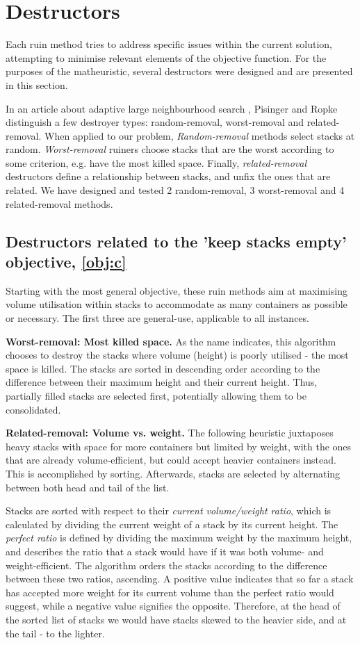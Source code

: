 \documentclass[preprint,11pt,3p]{elsarticle}
\begin{document}
\section{Destructors}
\label{sec:Neighbourhoods}
Each ruin method tries to address specific issues within the current solution, attempting to minimise relevant elements of the objective function. For the purposes of the matheuristic, several destructors were designed and are presented in this section.

In an article about adaptive large neighbourhood search \cite{PR-ALNS}, Pisinger and Ropke distinguish a few destroyer types: random-removal, worst-removal and related-removal. When applied to our problem, \textit{Random-removal} methods select stacks at random. \textit{Worst-removal} ruiners choose stacks that are the worst according to some criterion, e.g. have the most killed space. Finally, \textit{related-removal} destructors define a relationship between stacks, and unfix the ones that are related. We have designed and tested 2 random-removal, 3 worst-removal and 4 related-removal methods.

\subsection{Destructors related to the 'keep stacks empty' objective, \ref{obj:c}}
Starting with the most general objective, these ruin methods aim at maximising volume utilisation within stacks to accommodate as many containers as possible or necessary. The first three are general-use, applicable to all instances.

\textbf{Worst-removal: Most killed space.} As the name indicates, this algorithm chooses to destroy the stacks where volume (height) is poorly utilised - the most space is killed. The stacks are sorted in descending order according to the difference between their maximum height and their current height. Thus, partially filled stacks are selected first, potentially allowing them to be consolidated.

\textbf{Related-removal: Volume vs. weight.} The following heuristic juxtaposes heavy stacks with space for more containers but limited by weight, with the ones that are already volume-efficient, but could accept heavier containers instead. This is accomplished by sorting. Afterwards, stacks are selected by alternating between both head and tail of the list.

Stacks are sorted with respect to their \textit{current volume/weight ratio}, which is calculated by dividing the current weight of a stack by its current height. The \textit{perfect ratio} is defined by dividing the maximum weight by the maximum height, and describes the ratio that a stack would have if it was both volume- and weight-efficient. The algorithm orders the stacks according to the difference between these two ratios, ascending. A positive value indicates that so far a stack has accepted more weight for its current volume than the perfect ratio would suggest, while a negative value signifies the opposite. Therefore, at the head of the sorted list of stacks we would have stacks skewed to the heavier side, and at the tail - to the lighter.
\end{document}
